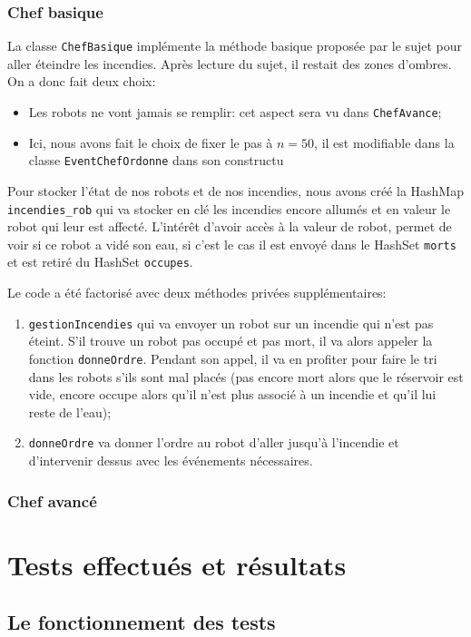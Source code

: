 \documentclass[a4paper,8pt]{article} %
\begin{document}
\subsubsection{Chef basique}
La  classe \texttt{ChefBasique} implémente la méthode basique proposée par le sujet pour aller éteindre les incendies.
Après lecture du sujet, il restait des zones d'ombres. On a donc fait deux choix:
\begin{itemize}
    \item Les robots ne vont jamais se remplir: cet aspect sera vu dans \texttt{ChefAvance};
    \item Ici, nous avons fait le choix de fixer le pas à $n=50$, il est modifiable dans la classe \texttt{EventChefOrdonne} dans son constructu
\end{itemize}

Pour stocker l'état de nos robots et de nos incendies, nous avons créé la HashMap \texttt{incendies\_rob} 
qui va stocker en clé les incendies encore allumés et en valeur le robot qui leur est affecté. L'intérêt d'avoir accès à la valeur de robot,
permet de voir si ce robot a vidé son eau, si c'est le cas il est envoyé dans le HashSet \texttt{morts} et est retiré du HashSet \texttt{occupes}.

Le code a été factorisé avec deux méthodes privées supplémentaires:
\begin{enumerate}
    \item \texttt{gestionIncendies} qui va envoyer un robot sur un incendie qui n'est pas éteint. S'il trouve un robot pas occupé et pas mort,
    il va alors appeler la fonction \texttt{donneOrdre}. Pendant son appel, il va en profiter pour faire le tri dans les robots s'ils sont
    mal placés (pas encore mort alors que le réservoir est vide, encore occupe alors qu'il n'est plus associé à un incendie et qu'il lui reste
    de l'eau);
    \item \texttt{donneOrdre} va donner l'ordre au robot d'aller jusqu'à l'incendie et d'intervenir dessus avec les événements nécessaires.
\end{enumerate}

\subsubsection{Chef avancé}
\section{Tests effectués et résultats}
\subsection{Le fonctionnement des tests}
\end{document}
